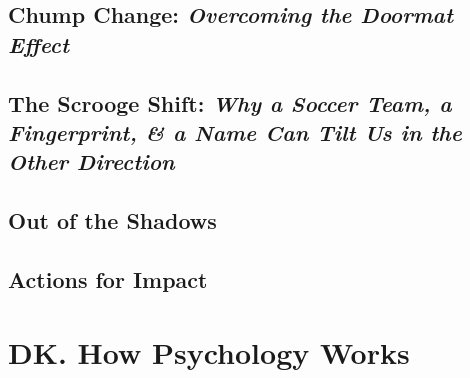 \documentclass[oneside]{book}
\numberwithin{equation}{section}
\begin{document}
\section{Chump Change: \textit{Overcoming the Doormat Effect}}


\section{The Scrooge Shift: \textit{Why a Soccer Team, a Fingerprint, \& a Name Can Tilt Us in the Other Direction}}


\section{Out of the Shadows}

\section{Actions for Impact}


\chapter{DK. How Psychology Works}
\end{document}
